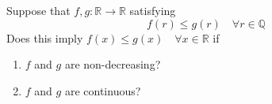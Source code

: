 Suppose that $f,g:\mathbb{R}\to \mathbb{R}$ satisfying
\[ f(r)\le g(r)\quad \forall r\in \mathbb{Q} \]
Does this imply $f(x)\le g(x)\quad \forall x\in \mathbb{R}$ if
\begin{enumerate}[label = (\alph*)]
  \item $f$ and $g$ are non-decreasing?
  \item $f$ and $g$ are continuous?
\end{enumerate}
